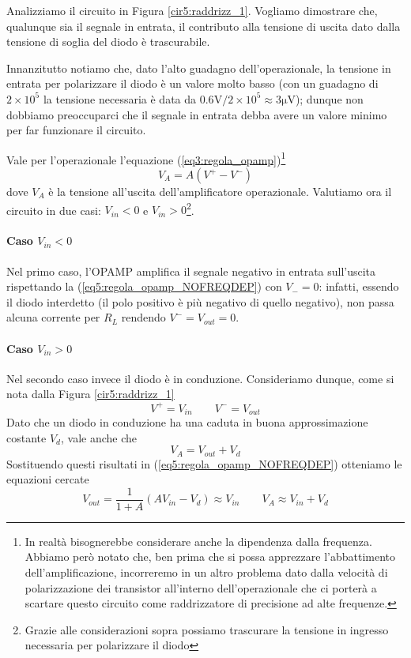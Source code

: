 Analizziamo il circuito in Figura \ref{cir5:raddrizz_1}. Vogliamo dimostrare che, qualunque sia il segnale in entrata, il contributo alla tensione di uscita dato dalla tensione di soglia del diodo è trascurabile.

Innanzitutto notiamo che, dato l'alto guadagno dell'operazionale, la tensione in entrata per polarizzare il diodo è un valore molto basso (con un guadagno di $2\times 10^5$ la tensione necessaria è data da $0.6 \si{\volt}/2\times 10^5 \approx 3 \si{\micro\volt}$); dunque non dobbiamo preoccuparci che il segnale in entrata debba avere un valore minimo per far funzionare il circuito.

Vale per l'operazionale l'equazione (\ref{eq3:regola_opamp})\footnote{In realtà bisognerebbe considerare anche la dipendenza dalla frequenza. Abbiamo però notato che, ben prima che si possa apprezzare l'abbattimento dell'amplificazione, incorreremo in un altro problema dato dalla velocità di polarizzazione dei transistor all'interno dell'operazionale che ci porterà a scartare questo circuito come raddrizzatore di precisione ad alte frequenze.}
\begin{equation}
V_{A}=A (V^+-V^-)
\label{eq5:regola_opamp_NOFREQDEP}
\end{equation}
dove $V_{A}$ è la tensione all'uscita dell'amplificatore operazionale.
Valutiamo ora il circuito in due casi: $V_{in}<0$ e $V_{in}>0$\footnote{Grazie alle considerazioni sopra possiamo trascurare la tensione in ingresso necessaria per polarizzare il diodo}.

\paragraph*{Caso $V_{in}<0$}

Nel primo caso, l'OPAMP amplifica il segnale negativo in entrata sull'uscita rispettando la (\ref{eq5:regola_opamp_NOFREQDEP}) con $V_-=0$: infatti, essendo il diodo interdetto (il polo positivo è più negativo di quello negativo), non passa alcuna corrente per $R_L$ rendendo $V^-=V_{out}=0$.

\paragraph*{Caso $V_{in}>0$}

Nel secondo caso invece il diodo è in conduzione. Consideriamo dunque, come si nota dalla Figura \ref{cir5:raddrizz_1}
$$V^+=V_{in} \qquad V^-=V_{out}$$
Dato che un diodo in conduzione ha una caduta in buona approssimazione costante $V_d$, vale anche che
$$V_{A}=V_{out}+V_d$$
Sostituendo questi risultati in (\ref{eq5:regola_opamp_NOFREQDEP}) otteniamo le equazioni cercate
\begin{equation}
V_{out}=\frac{1}{1+A} (A V_{in} - V_d) \approx V_{in} \qquad V_{A} \approx V_{in}+V_d
\label{eq5:leggi_1.1}
\end{equation}

